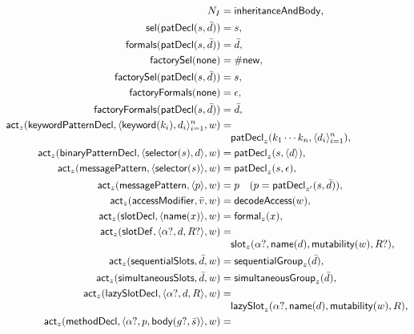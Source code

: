 \begin{equation}\label{eq:newspeak-declaration-actions}
\begin{aligned}
 N_I&=\mathsf{inheritanceAndBody},\\
 \mathsf{sel}(\kw{patDecl}(s,\bar d))&=s,\\
 \mathsf{formals}(\kw{patDecl}(s,\bar d))&=\bar d,\\
 \mathsf{factorySel}(\kw{none})&=\#\kw{new},\\
 \mathsf{factorySel}(\kw{patDecl}(s,\bar d))&=s,\\
 \mathsf{factoryFormals}(\kw{none})&=\epsilon,\\
 \mathsf{factoryFormals}(\kw{patDecl}(s,\bar d))&=\bar d,\\
 \mathsf{act}_{z}(\mathsf{keywordPatternDecl},
      \langle\kw{keyword}(k_i),d_i\rangle_{i=1}^{n},w)&=\\[-1mm]
 &\quad\kw{patDecl}_{z}(k_1\cdots k_n,\langle d_i\rangle_{i=1}^{n}),\\
 \mathsf{act}_{z}(\mathsf{binaryPatternDecl},
      \langle\kw{selector}(s),d\rangle,w)&=
      \kw{patDecl}_{z}(s,\langle d\rangle),\\
 \mathsf{act}_{z}(\mathsf{messagePattern},
      \langle\kw{selector}(s)\rangle,w)&=\kw{patDecl}_{z}(s,\epsilon),\\
 \mathsf{act}_{z}(\mathsf{messagePattern},\langle p\rangle,w)&=p
      \quad(p=\kw{patDecl}_{z'}(s,\bar d)),\\
 \mathsf{act}_{z}(\mathsf{accessModifier},\bar v,w)&=
      \mathsf{decodeAccess}(w),\\
 \mathsf{act}_{z}(\mathsf{slotDecl},\langle\kw{name}(x)\rangle,w)&=
      \kw{formal}_{z}(x),\\
 \mathsf{act}_{z}(\mathsf{slotDef},\langle\alpha?,d,R?\rangle,w)&=\\[-1mm]
 &\quad\kw{slot}_{z}(\alpha?,\mathsf{name}(d),
      \mathsf{mutability}(w),R?),\\
 \mathsf{act}_{z}(\mathsf{sequentialSlots},\bar d,w)&=
      \kw{sequentialGroup}_{z}(\bar d),\\
 \mathsf{act}_{z}(\mathsf{simultaneousSlots},\bar d,w)&=
      \kw{simultaneousGroup}_{z}(\bar d),\\
 \mathsf{act}_{z}(\mathsf{lazySlotDecl},
      \langle\alpha?,d,R\rangle,w)&=\\[-1mm]
 &\quad\kw{lazySlot}_{z}(\alpha?,\mathsf{name}(d),
      \mathsf{mutability}(w),R),\\
 \mathsf{act}_{z}(\mathsf{methodDecl},
      \langle\alpha?,p,\kw{body}(g?,\bar s)\rangle,w)&=\\[-1mm]

\end{aligned}
\end{equation}
